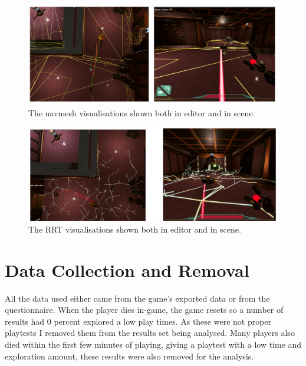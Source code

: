 \documentclass[journal]{IEEEtran}
\begin{document}
	\begin{figure}[h]
		\includegraphics[width=1.0\linewidth]{NavmeshVis.png}
		\caption{The navmesh visualisations shown both in editor and in scene.}
		\label{image:navmeshVisuals}
	\end{figure}  
	
	
	\begin{figure}[h]
		\includegraphics[width=1.0\linewidth]{RRTVis.png}
		\caption{The RRT visualisations shown both in editor and in scene.}
		\label{image:RRTVisuals}
	\end{figure}  
	
	\section{Data Collection and Removal}
	All the data used either came from the game's exported data or from the questionnaire. When the player dies in-game, the game resets so a number of results had 0 percent explored a low play times. As these were not proper playtests I removed them from the results set being analysed.  Many players also died within the first few minutes of playing, giving a playtest with a low time and exploration amount, these results were also removed for the analysis.
	
\end{document}
